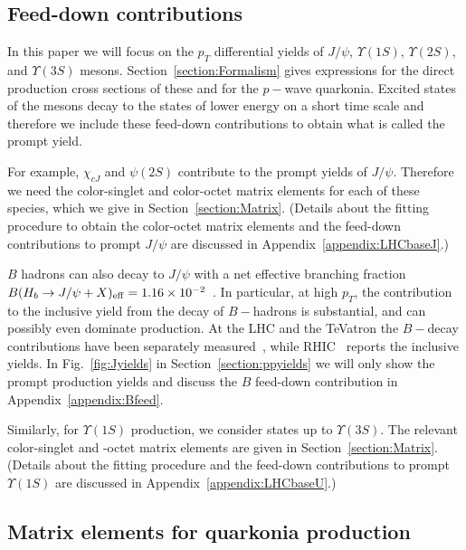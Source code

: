 \documentclass[article,showpacs,preprintnumbers,amsmath,amssymb]{revtex4}
\begin{document}
\subsection{Feed-down contributions}
In this paper we will focus on the $p_T$ differential yields of $J/\psi$,
$\Upsilon(1S)$, $\Upsilon(2S)$, and $\Upsilon(3S)$ mesons.
Section~\ref{section:Formalism} gives expressions for the direct production
cross sections of these and for the $p-$wave quarkonia. Excited states of the
mesons decay to the states of lower energy on a short time scale and therefore
we include these feed-down contributions to obtain what is called the prompt
yield.

For example, $\chi_{cJ}$ and $\psi(2S)$ contribute to the prompt yields of
$J/\psi$.  Therefore we need the color-singlet and color-octet matrix elements
for each of these species, which we give in Section~\ref{section:Matrix}.
(Details about the fitting procedure to obtain the color-octet matrix elements
and the feed-down contributions to prompt $J/\psi$ are discussed in
Appendix~\ref{appendix:LHCbaseJ}.)

$B$ hadrons can also decay to $J/\psi$ with a net effective branching fraction
$B(H_b\rightarrow J/\psi+X)_{\rm {eff}}
=1.16\times10^{-2}$~\cite{Acosta:2004yw}. In particular, at high $p_T$,
the contribution to the inclusive yield from the decay of $B-$hadrons is
substantial, and can possibly even dominate production.  At the LHC and the
TeVatron the $B-$decay contributions have been separately
measured~\cite{Acosta:2004yw,Aad:2011sp}, while
RHIC~\cite{Adare:2009js,Abelev:2009qaa} reports the inclusive yields. In
Fig.~\ref{fig:Jyields} in Section~\ref{section:ppyields} we will only show
the prompt production yields and discuss the $B$ feed-down contribution in
Appendix~\ref{appendix:Bfeed}.

Similarly, for $\Upsilon(1S)$ production, we consider states up to $\Upsilon(3S)$.
The relevant color-singlet and -octet matrix elements are given in
Section~\ref{section:Matrix}. (Details about the fitting procedure and the
feed-down contributions to prompt $\Upsilon(1S)$ are discussed in
Appendix~\ref{appendix:LHCbaseU}.)

\subsection{Matrix elements for quarkonia production~\label{section:Matrix}}
\end{document}

